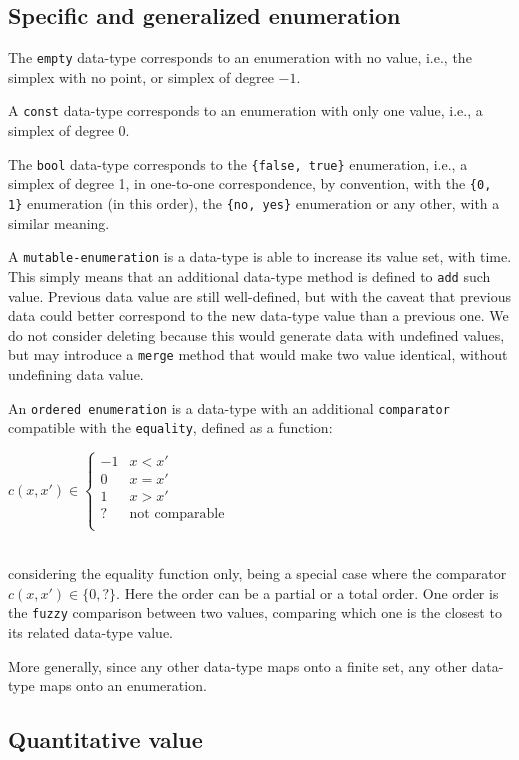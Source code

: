 \documentclass[a4,12pt]{article}
\newcommand{\eqline}[1]{\\\centerline{$#1$}\\}
\begin{document}
\subsection*{Specific and generalized enumeration} 

The {\tt empty} data-type corresponds to an enumeration with no value, i.e., the simplex with no point, or simplex of degree $-1$.

A {\tt const} data-type corresponds to an enumeration with only one value, i.e., a simplex of degree 0.

The {\tt bool} data-type corresponds to the {\tt \{false, true\}} enumeration, i.e., a simplex of degree 1, in one-to-one correspondence, by convention, with the {\tt \{0, 1\}} enumeration (in this order), the {\tt \{no, yes\}} enumeration or any other, with a similar meaning.

A {\tt mutable-enumeration} is a data-type is able to increase its value set, with time. This simply means that an additional data-type method is defined to {\tt add} such value. Previous data value are still well-defined, but with the caveat that previous data could better correspond to the new data-type value than a previous one. We do not consider deleting because this would generate data with undefined values, but may introduce a {\tt merge} method that would make two value identical, without undefining data value.

An {\tt ordered enumeration} is a data-type with an additional {\tt comparator} compatible with the {\tt equality}, defined as a function:
\eqline{c(x, x') \in \left\{\begin{array}{lr} -1 & x < x' \\ 0 & x = x' \\ 1 & x > x' \\ ? & \mbox{not comparable} \\ \end{array} \right.}
considering the equality function only, being a special case where the comparator $c(x, x') \in \{0, ?\}$. Here the order can be a partial or a total order. One order is the {\tt fuzzy} comparison between two values, comparing which one is the closest to its related data-type value.

More generally, since any other data-type maps onto a finite set, any other data-type maps onto an enumeration.

\subsection*{Quantitative value} 
\end{document}
